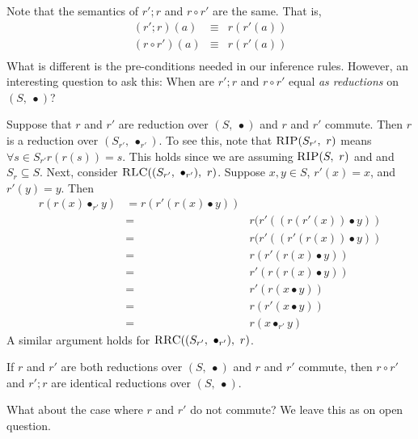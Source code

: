 Note that the semantics of $r' ; r$ and $r \circ r'$ are the same.
That is, 
\[
\begin{array}{rcl}
  ( r' ; r)(a) & \equiv & r (r'(a)) \\    
  ( r \circ r')(a) & \equiv & r (r'(a)) \\  
\end{array}   
\] 
What is different is the pre-conditions needed in our inference rules. 
However, an interesting question to ask this:
When are
$r' ; r$ and $r \circ r'$
equal \emph{as reductions} on $(S,\ \bullet)$? 


Suppose that  $r$ and $r'$ are reduction over $(S,\ \bullet)$ and
$r$ and $r'$ commute. 
Then $r$ is a reduction over $(S_{r'},\ \bullet_{r'})$.
To see this, note that
$\text{\textsc{RIP}}(S_{r'},\ r)$
means $\forall s \in S_{r'} r(r(s)) = s$.
This holds since we are assuming
$\text{\textsc{RIP}}(S,\ r)$ and 
and $S_r\subseteq S$. 
Next, consider 
$\propname{RLC}((S_{r'},\ \bullet_{r'}),\ r)$.
Suppose $x, y\in S$, 
$r'(x) = x$,  and
$r'(y) = y$.
Then 
\[
\begin{array}{rcl}
  r(r(x) \bullet_{r'} y)
  & =
  r(r'(r(x) \bullet y)) \\ 
  & =  
  & r(r'((r(r'(x)) \bullet y)) \\ 
  & =
  & r(r'((r'(r(x)) \bullet y)) \\
  & =
  & r(r'(r(x) \bullet y)) \\
  & =
  & r'(r(r(x) \bullet y)) \\
  & =
  & r'(r(x \bullet y)) \\
  & =
  & r(r'(x \bullet y)) \\
  & =  
  & r(x \bullet_{r'} y)
\end{array}   
\] 
A similar argument holds for
$\propname{RRC}((S_{r'},\ \bullet_{r'}),\ r)$.

\begin{theorem}
  If $r$ and $r'$ are both reductions over $(S,\ \bullet)$ and
  $r$ and $r'$ commute, then
  $r \circ r'$ and $r' ; r$ are identical reductions over $(S,\ \bullet)$. 
\end{theorem}

What about the case where $r$ and $r'$ do not commute?
We leave this as on open question. 
